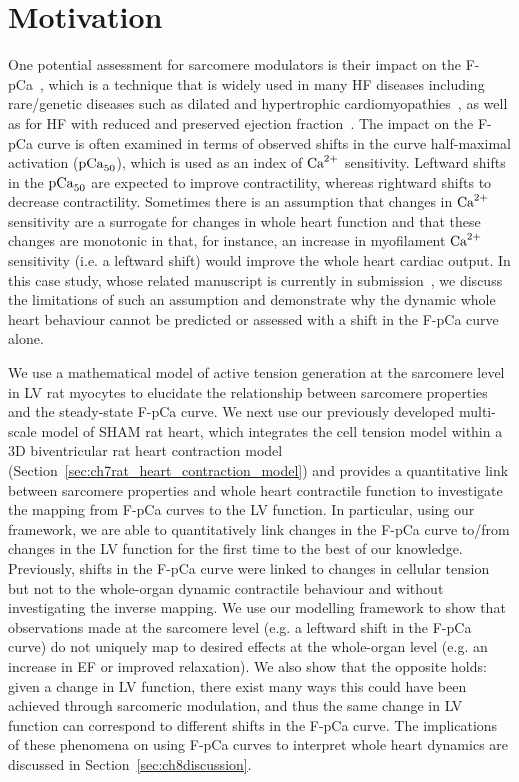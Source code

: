 \section{Motivation}\label{sec:ch8motivation}
One potential assessment for sarcomere modulators is their impact on the F-pCa~\cite{Walker:2010}, which is a technique that is widely used in many HF diseases including rare/genetic diseases such as dilated and hypertrophic cardiomyopathies~\cite{Groen:2020,Bai:2013,Michael:2016,Kirschner:2005,Harris:2002}, as well as for HF with reduced and preserved ejection fraction~\cite{Nagy:2015,Kampourakis:2018,Kieu:2019,Awinda:2021,Mamidi:2018,Sparrow:2020}. The impact on the F-pCa curve is often examined in terms of observed shifts in the curve half-maximal activation ($\textrm{pCa}_{50}$), which is used as an index of $\textrm{Ca}^{2+}$ sensitivity. Leftward shifts in the $\textrm{pCa}_{50}$ are expected to improve contractility, whereas rightward shifts to decrease contractility. Sometimes there is an assumption that changes in $\textrm{Ca}^{2+}$ sensitivity are a surrogate for changes in whole heart function and that these changes are monotonic in that, for instance, an increase in myofilament $\textrm{Ca}^{2+}$ sensitivity (i.e. a leftward shift) would improve the whole heart cardiac output. In this case study, whose related manuscript is currently in submission~\cite{Longobardi:2022}, we discuss the limitations of such an assumption and demonstrate why the dynamic whole heart behaviour cannot be predicted or assessed with a shift in the F-pCa curve alone.

\vspace{0.2cm}
We use a mathematical model of active tension generation at the sarcomere level in LV rat myocytes to elucidate the relationship between sarcomere properties and the steady-state F-pCa curve. We next use our previously developed multi-scale model of SHAM rat heart, which integrates the cell tension model within a $3$D biventricular rat heart contraction model (Section~\ref{sec:ch7rat_heart_contraction_model}) and provides a quantitative link between sarcomere properties and whole heart contractile function to investigate the mapping from F-pCa curves to the LV function. In particular, using our framework, we are able to quantitatively link changes in the F-pCa curve to/from changes in the LV function for the first time to the best of our knowledge. Previously, shifts in the F-pCa curve were linked to changes in cellular tension~\cite{Chung:2016} but not to the whole-organ dynamic contractile behaviour and without investigating the inverse mapping. We use our modelling framework to show that observations made at the sarcomere level (e.g. a leftward shift in the F-pCa curve) do not uniquely map to desired effects at the whole-organ level (e.g. an increase in EF or improved relaxation). We also show that the opposite holds: given a change in LV function, there exist many ways this could have been achieved through sarcomeric modulation, and thus the same change in LV function can correspond to different shifts in the F-pCa curve. The implications of these phenomena on using F-pCa curves to interpret whole heart dynamics are discussed in Section~\ref{sec:ch8discussion}.


